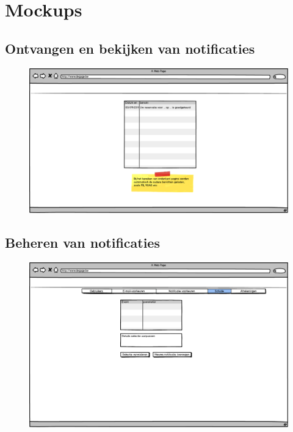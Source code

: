 \documentclass[11pt,a4paper,oneside]{article}
\begin{document}
\section{Mockups}
\subsection{Ontvangen en bekijken van notificaties}
\begin{figure}[H]\includegraphics[width=\textwidth]{../../mockups/notificaties.png}\end{figure}

\subsection{Beheren van notificaties}
\begin{figure}[H]\includegraphics[width=\textwidth]{../../mockups/admin_notificatievoorkeuren.png}\end{figure}

\setcounter{section}{0}
\setcounter{subsection}{0}
\end{document}

